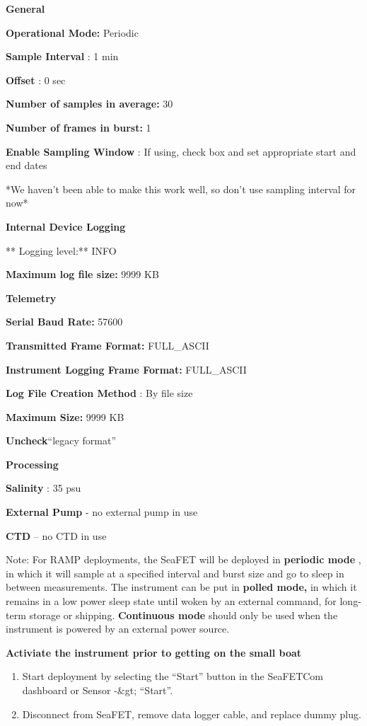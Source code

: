 \documentclass[]{book}
\providecommand{\tightlist}{%
  \setlength{\itemsep}{0pt}\setlength{\parskip}{0pt}}
\begin{document}
\textbf{General}

\textbf{Operational Mode:} Periodic

\textbf{Sample Interval} : 1 min

\textbf{Offset} : 0 sec

\textbf{Number of samples in average:} 30

\textbf{Number of frames in burst:} 1

\textbf{Enable Sampling Window} : If using, check box and set appropriate start and end dates

*We haven't been able to make this work well, so don't use sampling interval for now*

\textbf{Internal Device Logging}

** Logging level:** INFO

\textbf{Maximum log file size:} 9999 KB

\textbf{Telemetry}

\textbf{Serial Baud Rate:} 57600

\textbf{Transmitted Frame Format:} FULL\_ASCII

\textbf{Instrument Logging Frame Format:} FULL\_ASCII

\textbf{Log File Creation Method} : By file size

\textbf{Maximum Size:} 9999 KB

\textbf{Uncheck}``legacy format''

\textbf{Processing}

\textbf{Salinity} : 35 psu

\textbf{External Pump} - no external pump in use

\textbf{CTD} -- no CTD in use

Note: For RAMP deployments, the SeaFET will be deployed in \textbf{periodic mode} , in which it will sample at a specified interval and burst size and go to sleep in between measurements. The instrument can be put in \textbf{polled mode,} in which it remains in a low power sleep state until woken by an external command, for long-term storage or shipping. \textbf{Continuous mode} should only be used when the instrument is powered by an external power source.

\textbf{Activiate the instrument prior to getting on the small boat}

\begin{enumerate}
\def\labelenumi{\arabic{enumi}.}
\tightlist
\item
  Start deployment by selecting the ``Start'' button in the SeaFETCom dashboard or Sensor -\&gt; ``Start''.
\item
  Disconnect from SeaFET, remove data logger cable, and replace dummy plug.
\end{enumerate}
\end{document}

